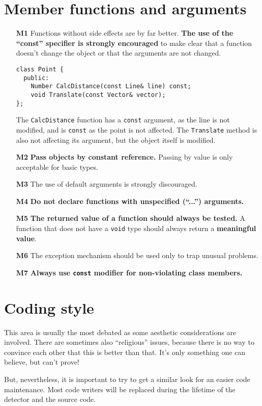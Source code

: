\documentclass[a4paper,10pt]{article}
\begin{document}
\begin{itemize}
\end{itemize}

\section{Member functions and arguments}
\begin{itemize}
\item[\bf M1] Functions without side effects are by far better. {\bf The use
  of the ``const'' specifier is strongly encouraged} to make clear that a
  function doesn't change the object or that the arguments are not changed.
  \begin{verbatim}
class Point {
  public:
    Number CalcDistance(const Line& line) const;
    void Translate(const Vector& vector);
};
  \end{verbatim}
  The {\tt CalcDistance} function has a {\tt const} argument, as the line is
  not modified, and is {\tt const} as the point is not affected. The
  {\tt Translate} method is also not affecting its argument, but the object
  itself is modified.
\item[\bf M2] {\bf Pass objects by constant reference.} Passing by value is
  only acceptable for basic types.
\item[\bf M3] The use of default arguments is strongly discouraged.
\item[\bf M4] {\bf Do not declare functions with unspecified (``...'')
  arguments.}
\item[\bf M5] {\bf The returned value of a function should always be tested.}
  A function that does not have a {\tt void} type should always return a
  {\bf meaningful value}.
\item[\bf M6] The exception mechanism should be used only to trap unusual
  problems.
\item[\bf M7] {\bf Always use {\tt const} modifier for non-violating class
  members.}
\end{itemize}

\section{Coding style}

This area is usually the most debated as some aesthetic considerations are
involved. There are sometimes also ``religious'' issues, because there is no
way to convince each other that this is better than that. It's only something
one can believe, but can't prove!

But, nevertheless, it is important to try to get a similar look for an easier
code maintenance. Most code writers will be replaced during the lifetime of
the detector and the source code.
\end{document}
